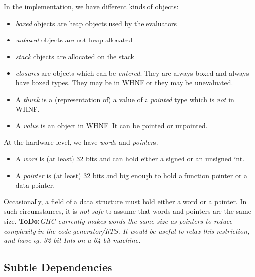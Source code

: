 \documentclass[11pt]{article}
\newcommand{\ToDo}[1]{{{\bf ToDo:}\sl #1}}
\begin{document}
In the implementation, we have different kinds of objects:

\begin{itemize}

\item \emph{boxed} objects are heap objects used by the evaluators

\item \emph{unboxed} objects are not heap allocated

\item \emph{stack} objects are allocated on the stack

\item \emph{closures} are objects which can be \emph{entered}. 
They are always boxed and always have boxed types.
They may be in WHNF or they may be unevaluated.  

\item A \emph{thunk} is a (representation of) a value of a \emph{pointed}
type which is \emph{not} in WHNF.

\item A \emph{value} is an object in WHNF.  It can be pointed or unpointed.

\end{itemize}



At the hardware level, we have \emph{word}s and \emph{pointer}s.

\begin{itemize}

\item A \emph{word} is (at least) 32 bits and can hold either a signed
or an unsigned int.

\item A \emph{pointer} is (at least) 32 bits and big enough to hold a
function pointer or a data pointer.  

\end{itemize}

Occasionally, a field of a data structure must hold either a word or a
pointer.  In such circumstances, it is \emph{not safe} to assume that
words and pointers are the same size.  \ToDo{GHC currently makes words
the same size as pointers to reduce complexity in the code
generator/RTS.  It would be useful to relax this restriction, and have
eg. 32-bit Ints on a 64-bit machine.}


\subsection{Subtle Dependencies}
\end{document}

